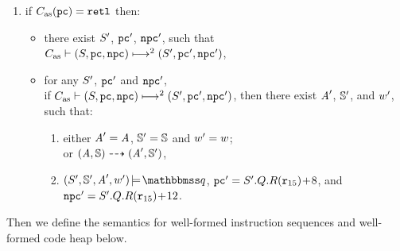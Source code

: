 \begin{definition}
\begin{enumerate}[1.]
        \item if {\em $\asmimp(\pc) = \retl$} then:
            \begin{itemize}
                \item there exist $\state'$, {\em $\pc'$}, {\em $\npc'$}, such that
                \\
                {\em $\multilptrans{\asmimp}{2}{(\state, \pc, \npc)}
                    {(\state', \pc', \npc')}$},

                \item for any {\em $\state'$}, {\em $\pc'$} 
                and {\em $\npc'$}, \\
                if
                {\em $\multilptrans{\asmimp}{2}{(\state, \pc, \npc)}{(\state', \pc', \npc')}$},
                then there exist {\em $\primcom'$}, {\em $\hpstate'$}, and {\em $\word'$},
                such that:
                \begin{enumerate}[(1)]
                    \item either $\primcom' = \primcom$,
                    $\hpstate' = \hpstate$ and $\word' = \word$; \\
                    or
                    $\primTrans{(\primcom, \hpstate)}
                        {(\primcom', \hpstate')}$,
                    \item $\asrtmodel{(\state', \hpstate', \primcom', \word')}
                        {\relastQ}$,
                        {\em $\pc' = \state'.\Rstate.\RFile(\reg{15}) \!+\! 8$},
                        and
                        {\em $\npc' = \state'.\Rstate.\RFile(\reg{15}) \!+\! 12$}.
                \end{enumerate}
            \end{itemize}
    \end{enumerate}
\end{definition}

Then we define the semantics for well-formed instruction
sequences and well-formed code heap below.

